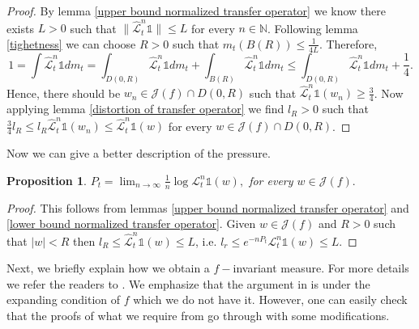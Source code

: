 \documentclass[12pt,reqno]{amsart}
\newtheorem{proposition}[theorem]{Proposition}
\begin{document}
\begin{proof}
    By lemma \ref{upper bound normalized transfer operator} we know there exists $L>0$ such that $\|\hat{\mathcal{L}}_t^n\mathbb{1}\|\leq L$ for every $n\in \mathbb{N}$. Following lemma \ref{tighetness} we can choose $R>0$ such that $m_t(B(R))\leq \frac{1}{4L}$. Therefore,
    $$1=\int \hat{\mathcal{L}}_t^n \mathbb{1}dm_t =\int _{D(0,R)}\hat{\mathcal{L}}_t^n \mathbb{1}dm_t+\int_{B(R)}\hat{\mathcal{L}}_t^n \mathbb{1}dm_t\leq \int _{D(0,R)}\hat{\mathcal{L}}_t^n \mathbb{1}dm_t+\frac{1}{4}.$$
    Hence, there should be $w_n \in \mathcal{J}(f) \cap D(0,R)$ such that $\hat{\mathcal{L}}_t^n \mathbb{1}(w_n)\geq \frac{3}{4}$. Now applying lemma \ref{distortion of transfer operator} we find $l_R>0$ such that $\frac{3}{4}l_R \leq l_R \hat{\mathcal{L}}_t^n \mathbb{1}(w_n)\leq \hat{\mathcal{L}}_t^n \mathbb{1}(w)$ for every $w \in \mathcal{J}(f) \cap D(0,R)$.
\end{proof}

\noindent Now we can give a better description of the pressure.
\begin{proposition}
    $P_t= \lim_{n \to \infty}\frac{1}{n}\log \mathcal{L}_t^n\mathbb{1}(w),$ for every $w \in \mathcal{J}(f).$
\end{proposition}
\begin{proof}
    This follows from lemmas \ref{upper bound normalized transfer operator} and \ref{lower bound normalized transfer operator}. Given $w\in \mathcal{J}(f)$ and $R>0$ such that $|w|<R$ then $l_R \leq \hat{\mathcal{L}}_t^n \mathbb{1}(w)\leq L$, i.e. $l_r \leq e^{-nP_t}{\mathcal{L}}_t^n \mathbb{1}(w)\leq L$.
\end{proof}

\noindent Next, we briefly explain how we obtain a $f-$invariant measure. For more details we refer the readers to \citep[p. 451, 453]{Munday}. We emphasize that the argument in \citep[p. 451, 453]{Munday} is under the expanding condition of $f$ which we do not have it. However, one can easily check that the proofs of what we require from \citep[p. 451, 453]{Munday} go through with some modifications.
\end{document}
